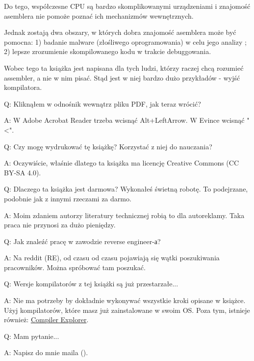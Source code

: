 Do tego, współczesne \ac{CPU} są bardzo skomplikowanymi urządzeniami i znajomość asemblera nie pomoże poznać ich mechanizmów wewnętrznych.

Jednak zostają dwa obszary, w których dobra znajomość asemblera może być pomocna:
1) badanie malware (złośliwego oprogramowania) w celu jego analizy ; 2) lepsze zrozumienie skompilowanego kodu w trakcie debuggowania.

Wobec tego ta książka jest napisana dla tych ludzi, którzy raczej chcą rozumieć assembler, a nie w nim pisać. Stąd jest w niej bardzo dużo przykładów - wyjść kompilatora.

\par Q: Kliknąłem w odnośnik wewnątrz pliku PDF, jak teraz wrócić?
\par A: W Adobe Acrobat Reader trzeba wcisnąć Alt+LeftArrow. W Evince wcisnąć "<".

\par Q: Czy mogę wydrukować tę książkę? Korzystać z niej do nauczania?
\par A: Oczywiście, właśnie dlatego ta książka ma licencję Creative Commons (CC BY-SA 4.0).

\par Q: Dlaczego ta książka jest darmowa? Wykonałeś świetną robotę. To podejrzane, podobnie jak z innymi rzeczami za darmo.
\par A: Moim zdaniem autorzy literatury technicznej robią to dla autoreklamy. Taka praca nie przynosi za dużo pieniędzy.

\par Q: Jak znaleźć pracę w zawodzie reverse engineer-а?
\par A: Na reddit (RE\FNURLREDDIT), od czasu od czasu pojawiają się wątki poszukiwania pracowników.
Można spróbować tam poszukać.


\par Q: Wersje kompilatorów z tej książki są już przestarzałe...
\par A: Nie ma potrzeby by dokładnie wykonywać wszystkie kroki opisane w książce.
Użyj kompilatorów, które masz już zainstalowane w swoim \ac{OS}.
Poza tym, istnieje również: \href{https://godbolt.org/}{Compiler Explorer}.

\par Q: Mam pytanie...
\par A: Napisz do mnie maila (\EMAILS).

